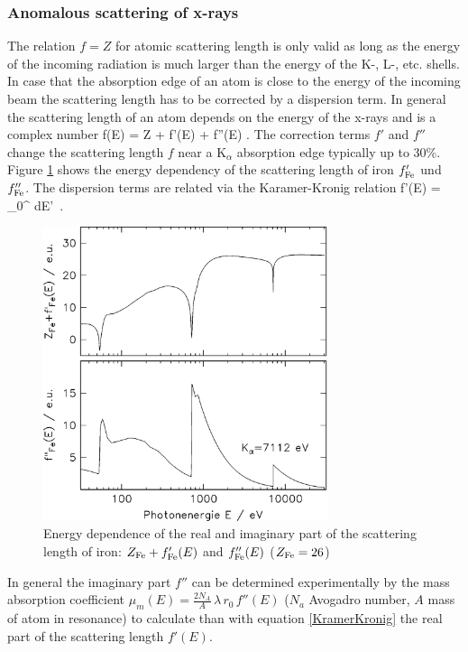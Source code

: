\subsubsection{Anomalous scattering of x-rays}

The relation $f=Z$ for atomic scattering length is only valid as long as the energy of the incoming radiation
is much larger than the energy of the K-, L-, etc. shells. In case that the absorption edge of an atom is close
to the energy of the incoming beam the scattering length has to be corrected by a dispersion term.
In general the scattering length of an atom depends on the energy of the x-rays and is a complex number
\BE
f(E) = Z + f'(E) + \imath f''(E) \quad .
\EE
The correction terms $f'$ and $f''$ change the scattering length $f$ near a
K$_{\alpha}$ absorption edge typically up to 30\%.
Figure \ref{fpfppsketch} shows the energy dependency of the scattering length of iron
$f'_{\rm Fe}$ und $f''_{\rm Fe}$.
The dispersion terms are related via the Karamer-Kronig relation
\BE
f'(E) = \, \int_0^{\infty} dE'\,
        .
\label{KramerKronig}
\EE
\begin{figure}[htb]
\begin{center}
\includegraphics[width=0.7441\textwidth,height=0.7858\textwidth]{FEFPFPP.png}
\caption{Energy dependence of the real and imaginary part of the scattering length of iron:
$Z_{\rm Fe}+ f'_{\rm Fe}(E)$ and $f''_{\rm Fe}(E)$ ($Z_{\rm Fe}=26$)}
\label{fpfppsketch}
\end{center}
\end{figure}
In general the imaginary part $f''$ can be determined experimentally by the mass absorption
coefficient $\mu_m(E)=\frac{2N_A}{A}\, \lambda\, r_0\, f''(E)$ ($N_a$ Avogadro number, $A$
mass of atom in resonance) to calculate than with equation \ref{KramerKronig} the real part of the
scattering length $f'(E)$.

